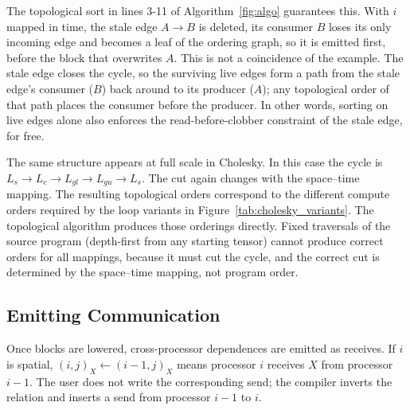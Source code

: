 \documentclass[sigplan, nonacm]{acmart}
\begin{document}
The topological sort in lines 3-11 of Algorithm~\ref{fig:algo} guarantees this. With $i$ mapped in time,  the stale edge $A \to B$ is deleted, its consumer $B$ loses its only incoming edge and
becomes a leaf of the ordering graph, so it is emitted
first, before the block that overwrites $A$. This is not a coincidence of
the example. The stale edge closes the cycle, so the surviving live edges
form a path from the stale edge's consumer ($B$) back around to its producer
($A$); any topological order of that path places the consumer before the
producer. In other words, sorting on live edges alone also enforces the
read-before-clobber constraint of the stale edge, for free.

The same structure appears at full scale in Cholesky. In this case the cycle
is $L_s \to L_c \to L_{gl} \to L_{gu} \to L_s$. The cut again changes with
the space--time mapping. The resulting topological orders correspond to the different compute orders required by the loop variants in Figure~\ref{tab:cholesky_variants}. %
The topological algorithm produces those orderings directly. Fixed traversals of the
source program (depth-first from any starting tensor) cannot produce correct orders for all mappings, because it must cut the cycle, and the correct cut is determined by the space--time mapping, not program order.


\subsection{Emitting Communication}
\label{sec:emitting-comm}


Once blocks are  lowered, cross-processor dependences are emitted as  receives. If $i$ is spatial, $(i,j)_X\leftarrow(i-1,j)_X$ means processor $i$ receives $X$ from processor $i-1$. The user does not write the corresponding send; the compiler inverts the relation and inserts a send from processor $i-1$ to $i$.
\end{document}
